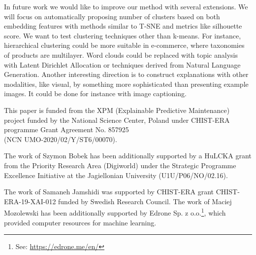 \documentclass[
 twocolumn,
 hf,
]{ceurart}
\begin{document}

In future work we would like to improve our method with several extensions.
We will focus on automatically proposing number of clusters based on both embedding features with methods similar to T-SNE and metrics like silhouette score.
We want to test clustering techniques other than k-means.
For instance, hierarchical clustering could be more suitable in e-commerce, where taxonomies of products are multilayer.
Word clouds could be replaced with topic analysis with Latent Dirichlet Allocation or techniques derived from Natural Language Generation.
Another interesting direction is to construct explanations with other modalities, like visual, by something more sophisticated than presenting example images.
It could be done for instance with image captioning.


\begin{acknowledgments}
  This paper is funded from the XPM (Explainable Predictive Maintenance) project funded by the National Science Center, Poland under CHIST-ERA programme Grant Agreement No. 857925 \\ (NCN UMO-2020/02/Y/ST6/00070).

  The work of Szymon Bobek has been additionally supported by a HuLCKA grant from the Priority Research Area (Digiworld) under the Strategic Programme Excellence Initiative at the Jagiellonian University (U1U/P06/NO/02.16).

  The work of Samaneh Jamshidi was supported by CHIST-ERA grant CHIST-ERA-19-XAI-012 funded by Swedish Research Council.
  The work of Maciej Mozolewski has been additionally supported by Edrone Sp. z o.o.\footnote{See: \url{https://edrone.me/en/}}, which provided computer resources for machine learning.
\end{acknowledgments}


\end{document}
